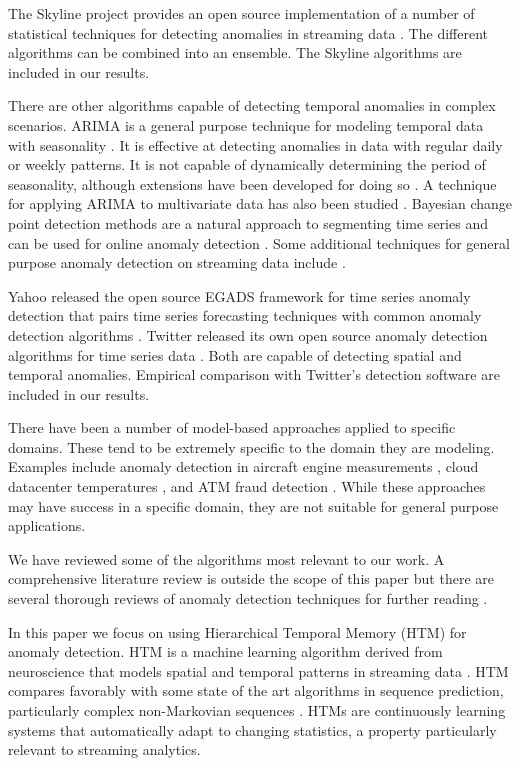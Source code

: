 \documentclass{article}
\begin{document}
The Skyline project provides an open source implementation of a number of
statistical techniques for detecting anomalies in streaming data
\cite{Stanway2013}. The different algorithms can be combined into an ensemble.
The Skyline algorithms are included in our results.

There are other algorithms capable of detecting temporal anomalies in complex
scenarios. ARIMA is a general purpose technique for modeling temporal data with
seasonality \cite{Bianco2001}. It is effective at detecting anomalies in data
with regular daily or weekly patterns. It is not capable of dynamically
determining the period of seasonality, although extensions have been developed
for doing so \cite{Hyndman2008}. A technique for applying ARIMA to multivariate
data has also been studied \cite{Tsay2000}. Bayesian change point detection
methods are a natural approach to segmenting time series and can be used for
online anomaly detection \cite{Adams2007,Tartakovsky2013}. Some
additional techniques for general purpose anomaly detection on streaming data
include \cite{Keogh2005, Rebbapragada2009}.

Yahoo released the open source EGADS framework for time series anomaly
detection that pairs time series forecasting techniques with common anomaly detection
algorithms \cite{laptev2015generic}. Twitter released its own open source anomaly
detection algorithms for time series data \cite{Kejariwal2015}. Both are
capable of detecting spatial and temporal anomalies. Empirical comparison with
Twitter's detection software are included in our results.

There have been a number of model-based approaches applied to specific domains.
These tend to be extremely specific to the domain they are modeling. Examples
include anomaly detection in aircraft engine measurements \cite{Simon2015},
cloud datacenter temperatures \cite{Lee2013}, and ATM fraud detection
\cite{Klerx2014}. While these approaches may have success in a specific domain,
they are not suitable for general purpose applications.

We have reviewed some of the algorithms most relevant to our work. A
comprehensive literature review is outside the scope of this paper but there are
several thorough reviews of anomaly detection techniques for further reading
\cite{Chandola2009, Hodge2004, Chandola2008}.

In this paper we focus on using Hierarchical Temporal Memory (HTM) for anomaly
detection. HTM is a machine learning algorithm derived from neuroscience
that models spatial and temporal patterns in streaming data \cite{Hawkins2016,
Rozado2012}. HTM compares favorably with some state of the art algorithms in
sequence prediction, particularly complex non-Markovian sequences \cite{Cui2015,
Padilla2013}. HTMs are continuously learning systems that automatically adapt
to changing statistics, a property particularly relevant to streaming analytics.
\end{document}
